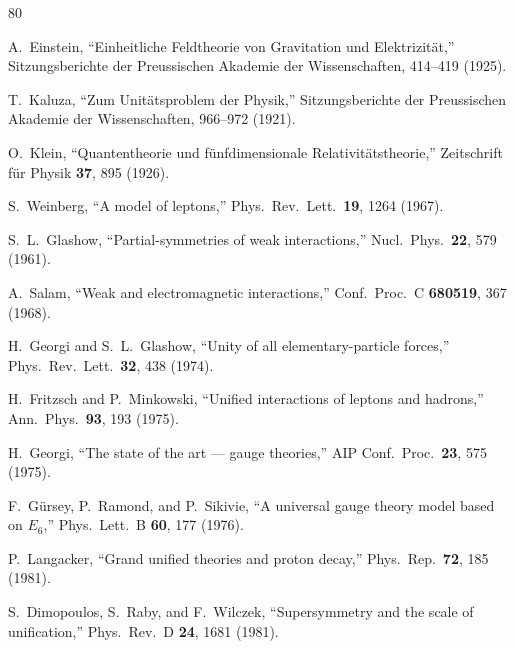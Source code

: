 \documentclass[aps,prd,twocolumn,showpacs,preprintnumbers,superscriptaddress,floatfix]{revtex4-2}
\begin{document}

\begin{thebibliography}{80}


A.~Einstein,
``Einheitliche Feldtheorie von Gravitation und Elektrizit\"at,''
Sitzungsberichte der Preussischen Akademie der Wissenschaften,
414--419 (1925).

T.~Kaluza,
``Zum Unit\"atsproblem der Physik,''
Sitzungsberichte der Preussischen Akademie der Wissenschaften,
966--972 (1921).

O.~Klein,
``Quantentheorie und f\"unfdimensionale Relativit\"atstheorie,''
Zeitschrift f\"ur Physik \textbf{37}, 895 (1926).


S.~Weinberg,
``A model of leptons,''
Phys.\ Rev.\ Lett.\ \textbf{19}, 1264 (1967).

S.~L.~Glashow,
``Partial-symmetries of weak interactions,''
Nucl.\ Phys.\ \textbf{22}, 579 (1961).

A.~Salam,
``Weak and electromagnetic interactions,''
Conf.\ Proc.\ C \textbf{680519}, 367 (1968).


H.~Georgi and S.~L.~Glashow,
``Unity of all elementary-particle forces,''
Phys.\ Rev.\ Lett.\ \textbf{32}, 438 (1974).

H.~Fritzsch and P.~Minkowski,
``Unified interactions of leptons and hadrons,''
Ann.\ Phys.\ \textbf{93}, 193 (1975).

H.~Georgi,
``The state of the art --- gauge theories,''
AIP Conf.\ Proc.\ \textbf{23}, 575 (1975).

F.~G\"ursey, P.~Ramond, and P.~Sikivie,
``A universal gauge theory model based on $E_6$,''
Phys.\ Lett.\ B \textbf{60}, 177 (1976).

P.~Langacker,
``Grand unified theories and proton decay,''
Phys.\ Rep.\ \textbf{72}, 185 (1981).

S.~Dimopoulos, S.~Raby, and F.~Wilczek,
``Supersymmetry and the scale of unification,''
Phys.\ Rev.\ D \textbf{24}, 1681 (1981).


\end{thebibliography}
\end{document}
